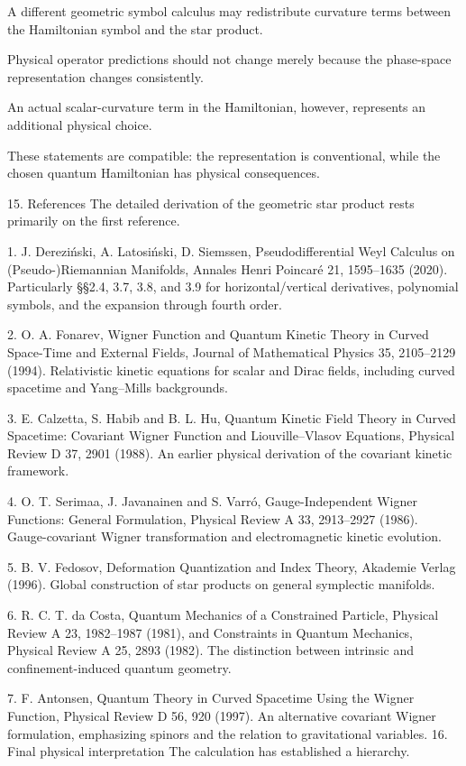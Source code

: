 A different geometric symbol calculus may redistribute curvature terms between the Hamiltonian symbol and the star product.

Physical operator predictions should not change merely because the phase-space representation changes consistently.

An actual scalar-curvature term in the Hamiltonian, however, represents an additional physical choice.

These statements are compatible: the representation is conventional, while the chosen quantum Hamiltonian has physical consequences.

15. References
The detailed derivation of the geometric star product rests primarily on the first reference.

1. J. Dereziński, A. Latosiński, D. Siemssen, Pseudodifferential Weyl Calculus on (Pseudo-)Riemannian Manifolds, Annales Henri Poincaré 21, 1595–1635 (2020). Particularly §§2.4, 3.7, 3.8, and 3.9 for horizontal/vertical derivatives, polynomial symbols, and the expansion through fourth order.

2. O. A. Fonarev, Wigner Function and Quantum Kinetic Theory in Curved Space-Time and External Fields, Journal of Mathematical Physics 35, 2105–2129 (1994). Relativistic kinetic equations for scalar and Dirac fields, including curved spacetime and Yang–Mills backgrounds.

3. E. Calzetta, S. Habib and B. L. Hu, Quantum Kinetic Field Theory in Curved Spacetime: Covariant Wigner Function and Liouville–Vlasov Equations, Physical Review D 37, 2901 (1988). An earlier physical derivation of the covariant kinetic framework.

4. O. T. Serimaa, J. Javanainen and S. Varró, Gauge-Independent Wigner Functions: General Formulation, Physical Review A 33, 2913–2927 (1986). Gauge-covariant Wigner transformation and electromagnetic kinetic evolution.

5. B. V. Fedosov, Deformation Quantization and Index Theory, Akademie Verlag (1996). Global construction of star products on general symplectic manifolds.

6. R. C. T. da Costa, Quantum Mechanics of a Constrained Particle, Physical Review A 23, 1982–1987 (1981), and Constraints in Quantum Mechanics, Physical Review A 25, 2893 (1982). The distinction between intrinsic and confinement-induced quantum geometry.

7. F. Antonsen, Quantum Theory in Curved Spacetime Using the Wigner Function, Physical Review D 56, 920 (1997). An alternative covariant Wigner formulation, emphasizing spinors and the relation to gravitational variables.
16. Final physical interpretation
The calculation has established a hierarchy.

